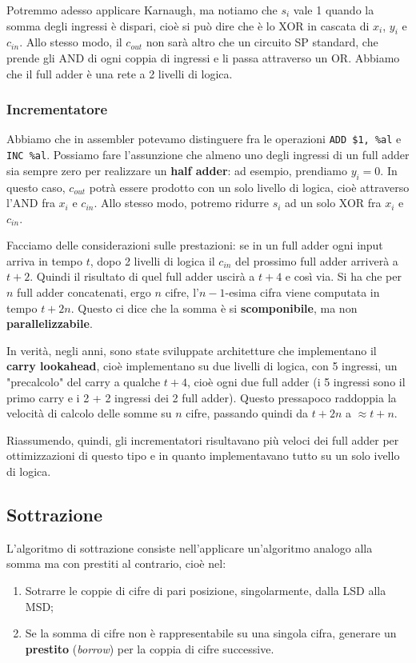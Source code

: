 \documentclass[a4paper,11pt]{article}
\begin{document}
Potremmo adesso applicare Karnaugh, ma notiamo che $s_i$ vale 1 quando la somma degli ingressi è dispari, cioè si può dire che è lo XOR in cascata di $x_i$, $y_i$ e $c_{in}$. 
Allo stesso modo, il $c_{out}$ non sarà altro che un circuito SP standard, che prende gli AND di ogni coppia di ingressi e li passa attraverso un OR.
Abbiamo che il full adder è una rete a 2 livelli di logica.

\subsubsection{Incrementatore}
Abbiamo che in assembler potevamo distinguere fra le operazioni \lstinline|ADD $1, %al| e \lstinline|INC %al|.
Possiamo fare l'assunzione che almeno uno degli ingressi di un full adder sia sempre zero per realizzare un \textbf{half adder}: ad esempio, prendiamo $y_i = 0$. 
In questo caso, $c_{out}$ potrà essere prodotto con un solo livello di logica, cioè attraverso l'AND fra $x_i$ e $c_{in}$.
Allo stesso modo, potremo ridurre $s_i$ ad un solo XOR fra $x_i$ e $c_{in}$.

Facciamo delle considerazioni sulle prestazioni: se in un full adder ogni input arriva in tempo $t$, dopo 2 livelli di logica il $c_{in}$ del prossimo full adder arriverà a $t + 2$.
Quindi il risultato di quel full adder uscirà a $t + 4$ e così via.
Si ha che per $n$ full adder concatenati, ergo $n$ cifre, l'$n-1$-esima cifra viene computata in tempo $t + 2n$.
Questo ci dice che la somma è si \textbf{scomponibile}, ma non \textbf{parallelizzabile}.

In verità, negli anni, sono state sviluppate architetture che implementano il \textbf{carry lookahead}, cioè implementano su due livelli di logica, con 5 ingressi, un "precalcolo" del carry a qualche $t + 4$, cioè ogni due full adder (i 5 ingressi sono il primo carry e i 2 + 2 ingressi dei 2 full adder).
Questo pressapoco raddoppia la velocità di calcolo delle somme su $n$ cifre, passando quindi da $t + 2n$ a $\approx t + n$.

Riassumendo, quindi, gli incrementatori risultavano più veloci dei full adder per ottimizzazioni di questo tipo e in quanto implementavano tutto su un solo ivello di logica.

\subsection{Sottrazione}
L'algoritmo di sottrazione consiste nell'applicare un'algoritmo analogo alla somma ma con prestiti al contrario, cioè nel:
\begin{enumerate}
	\item Sotrarre le coppie di cifre di pari posizione, singolarmente, dalla LSD alla MSD;
	\item Se la somma di cifre non è rappresentabile su una singola cifra, generare un \textbf{prestito} (\textit{borrow}) per la coppia di cifre successive.
\end{enumerate}
\end{document}
